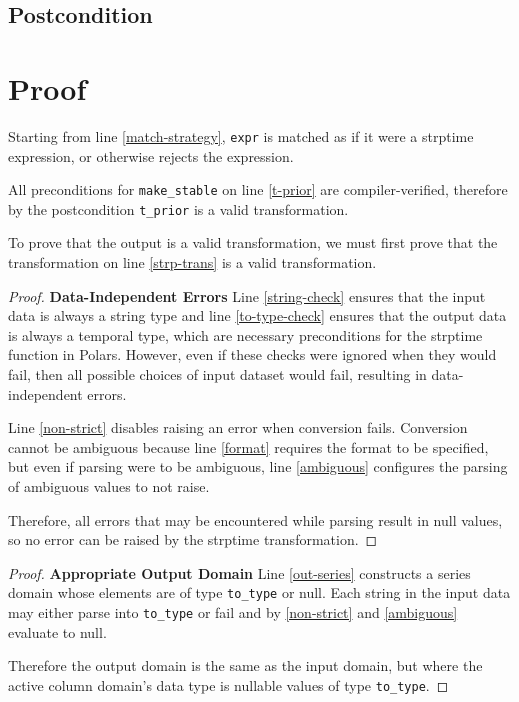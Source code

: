 \documentclass{article}
\begin{document}
\subsection*{Postcondition}

\section{Proof}

Starting from line \ref{match-strategy}, 
\texttt{expr} is matched as if it were a strptime expression, or otherwise rejects the expression.

All preconditions for \texttt{make\_stable} on line \ref{t-prior} are compiler-verified, 
therefore by the postcondition \texttt{t\_prior} is a valid transformation.

To prove that the output is a valid transformation, 
we must first prove that the transformation on line \ref{strp-trans} is a valid transformation.

\begin{proof}
    \textbf{Data-Independent Errors}
    Line \ref{string-check} ensures that the input data is always a string type and
    line \ref{to-type-check} ensures that the output data is always a temporal type,
    which are necessary preconditions for the strptime function in Polars.
    However, even if these checks were ignored when they would fail, 
    then all possible choices of input dataset would fail,
    resulting in data-independent errors.

    Line \ref{non-strict} disables raising an error when conversion fails.
    Conversion cannot be ambiguous because line \ref{format} requires the format to be specified,
    but even if parsing were to be ambiguous, line \ref{ambiguous} configures the parsing of ambiguous values to not raise.

    Therefore, all errors that may be encountered while parsing result in null values,
    so no error can be raised by the strptime transformation.
\end{proof}

\begin{proof}
    \textbf{Appropriate Output Domain}
    Line \ref{out-series} constructs a series domain whose elements are of type \texttt{to\_type} or null.
    Each string in the input data may either parse into \texttt{to\_type} or fail and by \ref{non-strict} and \ref{ambiguous} evaluate to null.

    Therefore the output domain is the same as the input domain, 
    but where the active column domain's data type is nullable values of type \texttt{to\_type}.
\end{proof}
\end{document}
